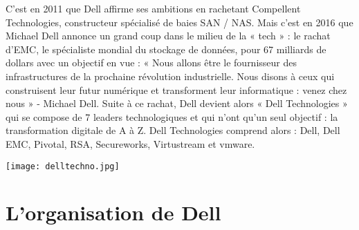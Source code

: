 \documentclass{bredele} %
\begin{document}
        C’est en 2011 que Dell affirme ses ambitions en rachetant Compellent Technologies, constructeur spécialisé de baies SAN / NAS.
        Mais c’est en 2016 que Michael Dell annonce un grand coup dans le milieu de la « tech » : le rachat d’EMC, le spécialiste mondial du stockage de données, pour 67 milliards de dollars avec un objectif en vue :
        « Nous allons être le fournisseur des infrastructures de la prochaine révolution industrielle. Nous disons à ceux qui construisent leur futur numérique et transforment leur informatique : venez chez nous » - Michael Dell.
        Suite à ce rachat, Dell devient alors « Dell Technologies » qui se compose de 7 leaders technologiques et qui n’ont qu’un seul objectif : la transformation digitale de A à Z.
        Dell Technologies comprend alors : Dell, Dell EMC, Pivotal, RSA, Secureworks, Virtustream et vmware.
        \begin{center}
        \texttt{[image: delltechno.jpg]}
        \end{center}

\chapter{L'organisation de Dell}
\end{document}
